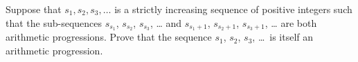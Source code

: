 Suppose that $s_1,s_2,s_3, \dotsc$ is a strictly increasing sequence of
positive integers such that the sub-sequences
$s_{s_1}$, $s_{s_2}$, $s_{s_3}$, \dots
and $s_{s_1 + 1}$, $s_{s_2 + 1}$, $s_{s_3 + 1}$, \dots
are both arithmetic progressions.
Prove that the sequence $s_1$, $s_2$, $s_3$, \dots\ is itself an arithmetic progression.
